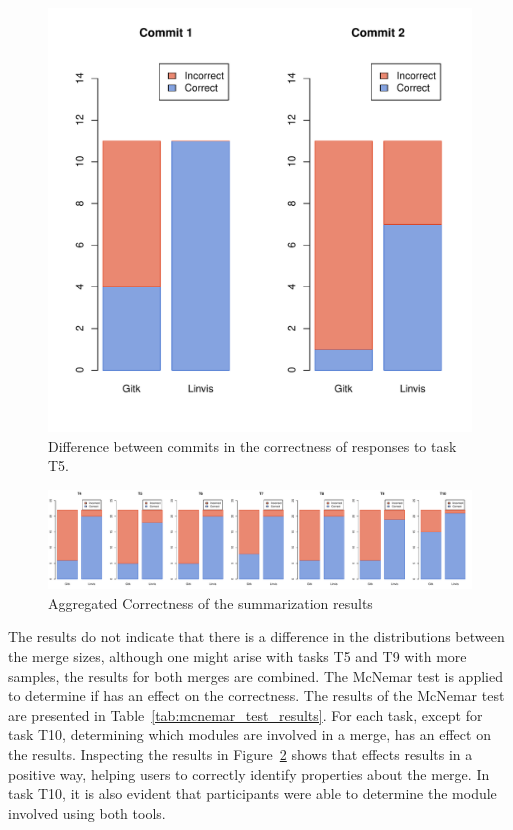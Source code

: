\begin{figure}[htpb]
  \centering
  \includegraphics[width=0.4\linewidth]{Figures/evaluation/correctness/5.pdf}
  \caption{Difference between commits in the correctness of responses to task T5.}
  \label{fig:T5_correctness}
\end{figure}


\begin{figure}[htpb]
  \centering
  \includegraphics[width=1.0\linewidth]{Figures/evaluation/correctness.pdf}
  \caption{Aggregated Correctness of the summarization results}
  \label{fig:agg_correctness}
\end{figure}

The results do not indicate that there is a difference in the
distributions between the merge sizes, although one might arise with
tasks T5 and T9 with more samples, the results for both merges are
combined. The McNemar test is applied to determine if \tool{} has an
effect on the correctness. The results of the McNemar test are presented
in Table~\ref{tab:mcnemar_test_results}. For each task, except for task
T10, determining which modules are involved in a merge, \tool{} has an
effect on the results. Inspecting the results in
Figure~\ref{fig:agg_correctness} shows that \tool{} effects results in a
positive way, helping users to correctly identify properties about the
merge. In task T10, it is also evident that participants were able to
determine the module involved using both tools.

